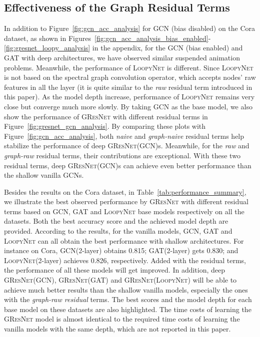 \documentclass{article}
\newcommand{\gresnet}{\textsc{GResNet}}
\newcommand{\gcn}{\textsc{GCN}}
\newcommand{\gat}{\textsc{GAT}}
\newcommand{\loopy}{\textsc{LoopyNet}}
\begin{document}
\vspace{-8pt}
\subsection{Effectiveness of the Graph Residual Terms}
\vspace{-8pt}

In addition to Figure~\ref{fig:gcn_acc_analysis} for {\gcn} (bias disabled) on the Cora dataset, as shown in Figures~\ref{fig:gcn_acc_analysis_bias_enabled}-\ref{fig:gresnet_loopy_analysis} in the appendix, for the {\gcn} (bias enabled) and {\gat} with deep architectures, we have observed similar suspended animation problems. Meanwhile, the performance of {\loopy} is different. Since {\loopy} is not based on the spectral graph convolution operator, which accepts nodes' raw features in all the layer (it is quite similar to the \textit{raw} residual term introduced in this paper). As the model depth increase, performance of {\loopy} remains very close but converge much more slowly. By taking {\gcn} as the base model, we also show the performance of {\gresnet} with different residual terms in Figure~\ref{fig:gresnet_gcn_analysis}. By comparing these plots with Figure~\ref{fig:gcn_acc_analysis}, both \textit{naive} and \textit{graph-naive} residual terms help stabilize the performance of deep {\gresnet}({\gcn})s. Meanwhile, for the \textit{raw} and \textit{graph-raw} residual terms, their contributions are exceptional. With these two residual terms, deep {\gresnet}({\gcn})s can achieve even better performance than the shallow vanilla {\gcn}s.

Besides the results on the Cora dataset, in Table~\ref{tab:performance_summary}, we illustrate the best observed performance by {\gresnet} with different residual terms based on {\gcn}, {\gat} and {\loopy} base models respectively on all the datasets. Both the best accuracy score and the achieved model depth are provided. According to the results, for the vanilla models, {\gcn}, {\gat} and {\loopy} can all obtain the best performance with shallow architectures. For instance on Cora, {\gcn}(2-layer) obtains 0.815; {\gat}(2-layer) gets 0.830; and {\loopy}(2-layer) achieves 0.826, respectively. Added with the residual terms, the performance of all these models will get improved. In addition, deep {\gresnet}({\gcn}), {\gresnet}({\gat}) and {\gresnet}({\loopy}) will be able to achieve much better results than the shallow vanilla models, especially the ones with the \textit{graph-raw residual} terms. The best scores and the model depth for each base model on these datasets are also highlighted. The time costs of learning the {\gresnet} model is almost identical to the required time costs of learning the vanilla models with the same depth, which are not reported in this paper. 
\end{document}
